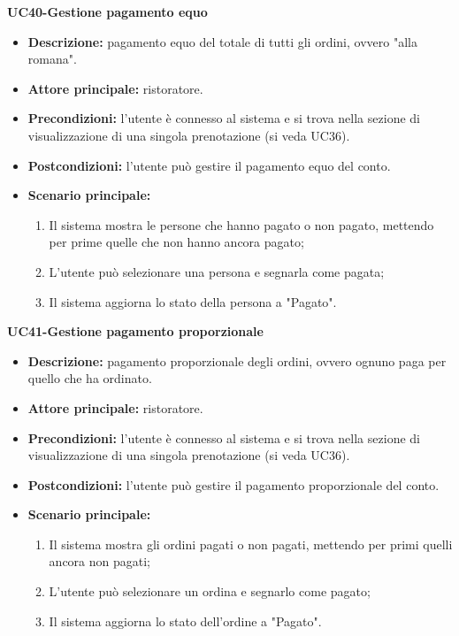 \textbf{UC40-Gestione pagamento equo}  
\begin{itemize}
    \item \textbf{Descrizione:} pagamento equo del totale di tutti gli ordini, ovvero "alla romana".
    \item \textbf{Attore principale:} ristoratore.
    \item \textbf{Precondizioni:} l'utente è connesso al sistema e si trova nella sezione di visualizzazione di una singola prenotazione (si veda UC36).
    \item \textbf{Postcondizioni:} l'utente può gestire il pagamento equo del conto.
    \item \textbf{Scenario principale:}
    \begin{enumerate}
        \item Il sistema mostra le persone che hanno pagato o non pagato, mettendo per prime quelle che non hanno ancora pagato;
        \item L'utente può selezionare una persona e segnarla come pagata;
        \item Il sistema aggiorna lo stato della persona a "Pagato".
    \end{enumerate}
\end{itemize}

\textbf{UC41-Gestione pagamento proporzionale}  
\begin{itemize}
    \item \textbf{Descrizione:} pagamento proporzionale degli ordini, ovvero ognuno paga per quello che ha ordinato.
    \item \textbf{Attore principale:} ristoratore.
    \item \textbf{Precondizioni:} l'utente è connesso al sistema e si trova nella sezione di visualizzazione di una singola prenotazione (si veda UC36).
    \item \textbf{Postcondizioni:} l'utente può gestire il pagamento proporzionale del conto.
    \item \textbf{Scenario principale:}
    \begin{enumerate}
        \item Il sistema mostra gli ordini pagati o non pagati, mettendo per primi quelli ancora non pagati;
        \item L'utente può selezionare un ordina e segnarlo come pagato;
        \item Il sistema aggiorna lo stato dell'ordine a "Pagato".
    \end{enumerate}
\end{itemize}

